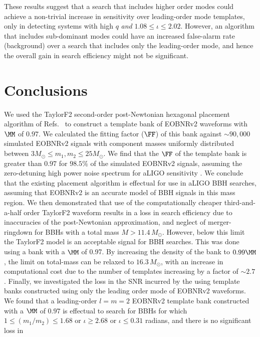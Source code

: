 These results suggest that a search that includes higher order modes
could achieve a non-trivial increase in sensitivity over leading-order mode
templates, only in detecting systems with high $q$ \textit{and} $1.08\leq\iota\leq 2.02$.  
However, an algorithm that includes sub-dominant modes could have an 
increased false-alarm rate (background) over a search that includes 
only the leading-order mode, and hence the overall gain in search efficiency
might not be significant. 

\section{Conclusions}
\label{s:conclusions}

We used the TaylorF2 second-order post-Newtonian hexagonal placement algorithm
of Refs.~\citep{SathyaMetric2PN,BabaketalBankPlacement,Cokelaer:2007kx} to construct a
template bank of EOBNRv2 waveforms with $\MM$ of $0.97$. We calculated the
fitting factor ($\FF$) of this bank against $\sim 90,000$ simulated EOBNRv2
signals with component masses uniformly distributed between $3 M_{\odot} \le
m_1,m_2 \le 25 M_{\odot}$. We find that the $\FF$ of the template bank is
greater than $0.97$ for $98.5\%$ of the simulated EOBNRv2 signals, assuming
the zero-detuning high power noise spectrum for aLIGO sensitivity
\citep{aLIGONoiseCurve}. We conclude that the existing placement algorithm is
effectual for use in aLIGO BBH searches, assuming that EOBNRv2 is an accurate
model of BBH signals in this mass region.  We then demonstrated that use of the
computationally cheaper third-and-a-half order TaylorF2 waveform results in a
loss in search efficiency due to inaccuracies of the post-Newtonian
approximation, and neglect of merger-ringdown for BBHs with a total mass $M >
11.4\,M_{\odot}$. However, below this limit the TaylorF2 model is an acceptable
signal for BBH searches. This was done using a bank with a $\MM$ of 0.97. By 
increasing the density of the bank to $0.99\MM$, the limit on total-mass can be 
relaxed to $16.3\,M_{\odot}$, with an increase in computational cost due to the 
number of templates increasing by a factor of $\sim 2.7$. Finally, we investigated 
the loss in the SNR incurred by the using template banks constructed using 
only the leading order mode of EOBNRv2 waveforms.  We found that a leading-order 
$l=m=2$ EOBNRv2 template bank constructed with a $\MM$ of $0.97$ is effectual 
to search for BBHs for which $1\leq \left(m_1/m_2\right)\leq 1.68$ or $\iota \geq 2.68$ 
or $\iota\leq 0.31$ radians, and there is no significant loss in
